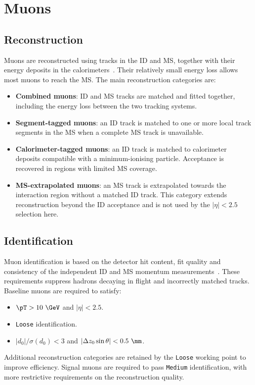\section{Muons}
\label{sec:ch6_muons}

\subsection{Reconstruction}

Muons are reconstructed using tracks in the ID and MS, together with their energy deposits in the calorimeters~\cite{ATLAS2021MuonID}.
Their relatively small energy loss allows most muons to reach the MS.
The main reconstruction categories are:
\begin{itemize}
    \item \textbf{Combined muons}: ID and MS tracks are matched and fitted together, including the energy loss between the two tracking systems.
    \item \textbf{Segment-tagged muons}: an ID track is matched to one or more local track segments in the MS when a complete MS track is unavailable.
    \item \textbf{Calorimeter-tagged muons}: an ID track is matched to calorimeter deposits compatible with a minimum-ionising particle. Acceptance is recovered in regions with limited MS coverage.
    \item \textbf{MS-extrapolated muons}: an MS track is extrapolated towards the interaction region without a matched ID track. This category extends reconstruction beyond the ID acceptance and is not used by the $|\eta|<2.5$ selection here.
\end{itemize}

\subsection{Identification}

Muon identification is based on the detector hit content, fit quality and consistency of the independent ID and MS momentum measurements~\cite{ATLAS2021MuonID}.
These requirements suppress hadrons decaying in flight and incorrectly matched tracks.
Baseline muons are required to satisfy:
\begin{itemize}
    \item $\pT>10~\GeV$ and $|\eta|<2.5$.
    \item \texttt{Loose} identification.
    \item $|d_0|/\sigma(d_0)<3$ and $|\Delta z_0\sin\theta|<0.5~\mm$.
\end{itemize}
Additional reconstruction categories are retained by the \texttt{Loose} working point to improve efficiency.
Signal muons are required to pass \texttt{Medium} identification, with more restrictive requirements on the reconstruction quality.


